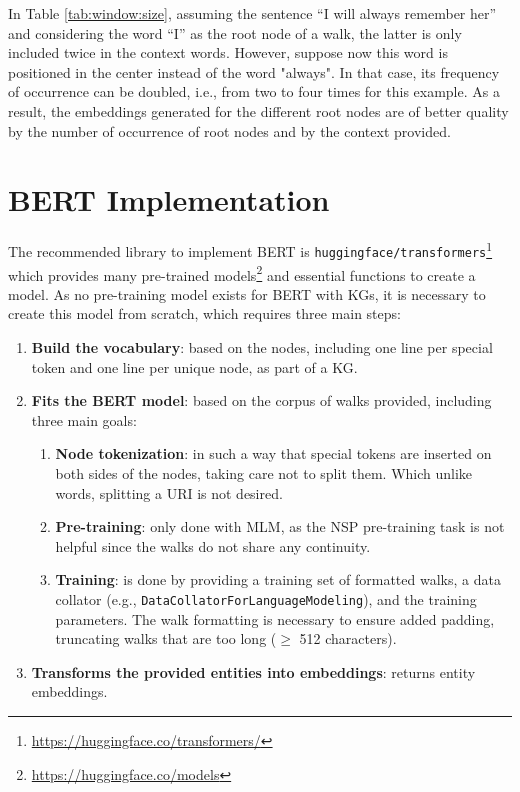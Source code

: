 In Table \ref{tab:window:size}, assuming the sentence ``I will always remember
her'' and considering the word ``I'' as the root node of a walk, the latter is
only included twice in the context words. However, suppose now this word is
positioned in the center instead of the word "always". In that case, its
frequency of occurrence can be doubled, i.e., from two to four times for this
example. As a result, the embeddings generated for the different root nodes are
of better quality by the number of occurrence of root nodes and by the context
provided.

\section{BERT Implementation}
\label{sec:bert:implementation}

The recommended library to implement BERT is
\texttt{huggingface/transformers}\footnote{\url{https://huggingface.co/transformers/}}
which provides many pre-trained
models\footnote{\url{https://huggingface.co/models}} and essential functions to
create a model. As no pre-training model exists for BERT with KGs, it is
necessary to create this model from scratch, which requires three main steps:
\begin{enumerate}
\item \textbf{Build the vocabulary}: based on the nodes, including one line per
  special token and one line per unique node, as part of a KG.
\item \textbf{Fits the BERT model}: based on the corpus of walks provided, including three main goals:
  \begin{multicols}{2}
    \begin{enumerate}
    \item \textbf{Node tokenization}: in such a way that special tokens are
      inserted on both sides of the nodes, taking care not to split them. Which unlike
      words, splitting a URI is not desired.
    \item \textbf{Pre-training}: only done with MLM, as the NSP pre-training
      task is not helpful since the walks do not share any continuity.
    \item \textbf{Training}: is done by providing a training set of formatted
      walks, a data collator (e.g., \texttt{DataCollatorForLanguageModeling}), and the
      training parameters. The walk formatting is necessary to ensure added
      padding, truncating walks that are too long ($\geq$ 512 characters).
    \end{enumerate}
  \end{multicols}
\item \textbf{Transforms the provided entities into embeddings}: returns entity embeddings.
\end{enumerate}

